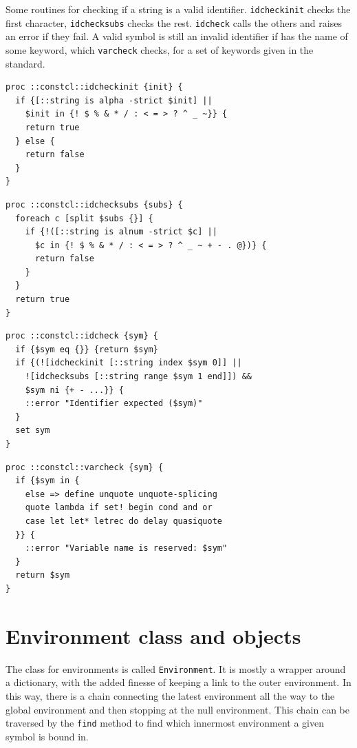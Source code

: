 \documentclass[twoside]{report}
\begin{document}
Some routines for checking if a string is a valid identifier. \texttt{idcheckinit} checks the first character, \texttt{idchecksubs} checks the rest. \texttt{idcheck} calls the others and raises an error if they fail. A valid symbol is still an invalid identifier if has the name of some keyword, which \texttt{varcheck} checks, for a set of keywords given in the standard.

\begin{lstlisting}
proc ::constcl::idcheckinit {init} {
  if {[::string is alpha -strict $init] ||
    $init in {! $ % & * / : < = > ? ^ _ ~}} {
    return true
  } else {
    return false
  }
}
\end{lstlisting}

\begin{lstlisting}
proc ::constcl::idchecksubs {subs} {
  foreach c [split $subs {}] {
    if {!([::string is alnum -strict $c] ||
      $c in {! $ % & * / : < = > ? ^ _ ~ + - . @})} {
      return false
    }
  }
  return true
}
\end{lstlisting}

\begin{lstlisting}
proc ::constcl::idcheck {sym} {
  if {$sym eq {}} {return $sym}
  if {(![idcheckinit [::string index $sym 0]] ||
    ![idchecksubs [::string range $sym 1 end]]) &&
    $sym ni {+ - ...}} {
    ::error "Identifier expected ($sym)"
  }
  set sym
}
\end{lstlisting}

\begin{lstlisting}
proc ::constcl::varcheck {sym} {
  if {$sym in {
    else => define unquote unquote-splicing
    quote lambda if set! begin cond and or
    case let let* letrec do delay quasiquote
  }} {
    ::error "Variable name is reserved: $sym"
  }
  return $sym
}
\end{lstlisting}

\chapter{Environment class and objects}
\label{environment-class-and-objects}

The class for environments is called \texttt{Environment}. It is mostly a wrapper around a dictionary, with the added finesse of keeping a link to the outer environment. In this way, there is a chain connecting the latest environment all the way to the global environment and then stopping at the null environment. This chain can be traversed by the \texttt{find} method to find which innermost environment a given symbol is bound in.
\end{document}
